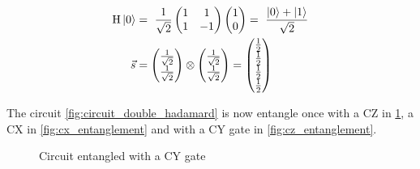 \begin{equation}
    \centering
    \begin{split}
        \mathrm{H}\ket{0} &=\ \frac{1}{\sqrt{2}}\begin{pmatrix}1 & 1 \\1 & -1\end{pmatrix}\begin{pmatrix}1 \\ 0\end{pmatrix} =\ \frac{\ket{0} + \ket{1}}{\sqrt{2}} \\
        \vec{s} &= \begin{pmatrix}\frac{1}{\sqrt{2}}\\\frac{1}{\sqrt{2}}\end{pmatrix} \otimes \begin{pmatrix}\frac{1}{\sqrt{2}}\\\frac{1}{\sqrt{2}}\end{pmatrix} = \begin{pmatrix}
            \frac{1}{2}\\\frac{1}{2}\\\frac{1}{2}\\\frac{1}{2}
        \end{pmatrix}
    \end{split}
    \label{equation:two_hadamard_example}
\end{equation}

The circuit \ref{fig:circuit_double_hadamard} is now entangle once with a $\mathrm{CZ}$\cite{qiskit_czgate_nodate} in \ref{fig:cy_entanglement}, a $\mathrm{CX}$\cite{qiskit_cxgate_nodate} in \ref{fig:cx_entanglement} and with a $\mathrm{CY}$\cite{qiskit_cygate_nodate} gate in \ref{fig:cz_entanglement}.


\begin{figure}[!h]
    \centering
    \caption{Circuit entangled with a $\mathrm{CY}$ gate}
    \label{fig:cy_entanglement}
\end{figure}


